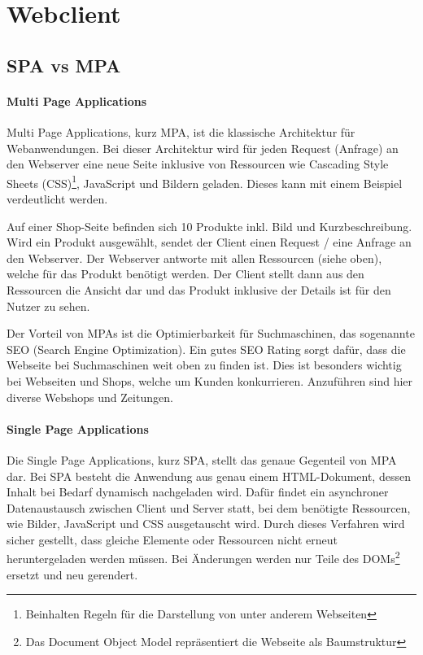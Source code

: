 \section{Webclient} \label{sec:Webclient}
\subsection{SPA vs MPA} \label{subsec:SPA_vs_MPA}

\paragraph{Multi  Page Applications} \label{para:Multi_Page_Applications}
Multi Page Applications, kurz MPA, ist die klassische Architektur für Webanwendungen. Bei dieser Architektur wird für jeden Request (Anfrage) an den Webserver eine neue Seite inklusive von Ressourcen wie Cascading Style Sheets (CSS)\footnote{Beinhalten Regeln für die Darstellung von unter anderem Webseiten}, JavaScript und Bildern geladen. Dieses kann mit einem Beispiel verdeutlicht werden.

Auf einer Shop-Seite befinden sich 10 Produkte inkl. Bild und Kurzbeschreibung. Wird ein Produkt ausgewählt, sendet der Client einen Request / eine Anfrage an den Webserver. Der Webserver antworte mit allen Ressourcen (siehe oben), welche für das Produkt benötigt werden. Der Client stellt dann aus den Ressourcen die Ansicht dar und das Produkt inklusive der Details ist für den Nutzer zu sehen.

Der Vorteil von MPAs ist die Optimierbarkeit für Suchmaschinen, das sogenannte SEO (Search Engine Optimization). Ein gutes SEO Rating sorgt dafür, dass die Webseite bei Suchmaschinen weit oben zu finden ist. Dies ist besonders wichtig bei Webseiten und Shops, welche um Kunden konkurrieren. Anzuführen sind hier diverse Webshops und Zeitungen.

\paragraph{Single Page Applications} \label{para:Single_Page_Applications}
Die Single Page Applications, kurz SPA, stellt das genaue Gegenteil von MPA dar. Bei SPA besteht die Anwendung aus genau einem HTML-Dokument, dessen Inhalt bei Bedarf dynamisch nachgeladen wird. Dafür findet ein asynchroner Datenaustausch zwischen Client und Server statt, bei dem benötigte Ressourcen, wie Bilder, JavaScript und CSS ausgetauscht wird. Durch dieses Verfahren wird sicher gestellt, dass gleiche Elemente oder Ressourcen nicht erneut heruntergeladen werden müssen. Bei Änderungen werden nur Teile des DOMs\footnote{Das Document Object Model repräsentiert die Webseite als Baumstruktur} ersetzt und neu gerendert.

